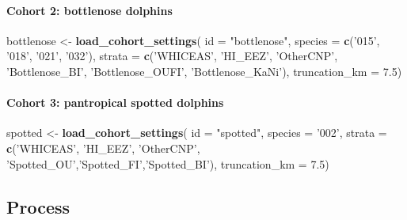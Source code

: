 \documentclass[
]{book}
\newenvironment{Shaded}{\begin{snugshade}}{\end{snugshade}}
\newcommand{\DataTypeTok}[1]{\textcolor[rgb]{0.13,0.29,0.53}{#1}}
\newcommand{\FloatTok}[1]{\textcolor[rgb]{0.00,0.00,0.81}{#1}}
\newcommand{\KeywordTok}[1]{\textcolor[rgb]{0.13,0.29,0.53}{\textbf{#1}}}
\newcommand{\NormalTok}[1]{#1}
\newcommand{\StringTok}[1]{\textcolor[rgb]{0.31,0.60,0.02}{#1}}
\begin{document}
\hypertarget{cohort-2-bottlenose-dolphins}{%
\paragraph{Cohort 2: bottlenose dolphins}\label{cohort-2-bottlenose-dolphins}}

\begin{Shaded}
\begin{Highlighting}[]
\NormalTok{bottlenose <-}\StringTok{ }\KeywordTok{load_cohort_settings}\NormalTok{(}
  \DataTypeTok{id =} \StringTok{"bottlenose"}\NormalTok{,}
  \DataTypeTok{species =} \KeywordTok{c}\NormalTok{(}\StringTok{'015'}\NormalTok{, }\StringTok{'018'}\NormalTok{, }\StringTok{'021'}\NormalTok{, }\StringTok{'032'}\NormalTok{),}
  \DataTypeTok{strata =} \KeywordTok{c}\NormalTok{(}\StringTok{'WHICEAS'}\NormalTok{, }\StringTok{'HI_EEZ'}\NormalTok{, }\StringTok{'OtherCNP'}\NormalTok{,}
             \StringTok{'Bottlenose_BI'}\NormalTok{, }\StringTok{'Bottlenose_OUFI'}\NormalTok{, }\StringTok{'Bottlenose_KaNi'}\NormalTok{),}
  \DataTypeTok{truncation_km =} \FloatTok{7.5}\NormalTok{)}
\end{Highlighting}
\end{Shaded}

\hypertarget{cohort-3-pantropical-spotted-dolphins}{%
\paragraph{Cohort 3: pantropical spotted dolphins}\label{cohort-3-pantropical-spotted-dolphins}}

\begin{Shaded}
\begin{Highlighting}[]
\NormalTok{spotted <-}\StringTok{ }\KeywordTok{load_cohort_settings}\NormalTok{(}
  \DataTypeTok{id =} \StringTok{"spotted"}\NormalTok{,}
  \DataTypeTok{species =} \StringTok{'002'}\NormalTok{,}
  \DataTypeTok{strata =} \KeywordTok{c}\NormalTok{(}\StringTok{'WHICEAS'}\NormalTok{, }\StringTok{'HI_EEZ'}\NormalTok{, }\StringTok{'OtherCNP'}\NormalTok{,}
             \StringTok{'Spotted_OU'}\NormalTok{,}\StringTok{'Spotted_FI'}\NormalTok{,}\StringTok{'Spotted_BI'}\NormalTok{),}
  \DataTypeTok{truncation_km =} \FloatTok{7.5}\NormalTok{)}
\end{Highlighting}
\end{Shaded}

\hypertarget{process}{%
\subsection*{Process}\label{process}}
\end{document}
